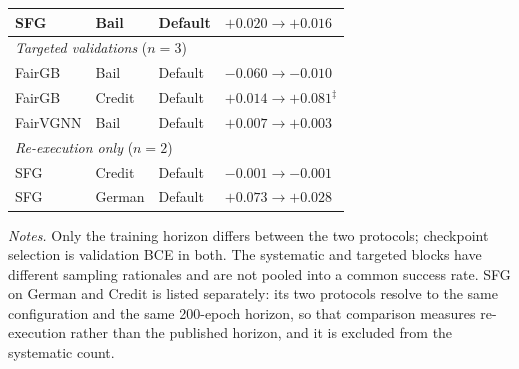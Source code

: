 \begin{table}[t]
\begin{tabular}{llll}
SFG & Bail & Default
& \(+0.020 \rightarrow +0.016\) \\

\midrule
\multicolumn{4}{l}{\textit{Targeted validations} (\(n=3\))} \\
\addlinespace[1pt]

FairGB & Bail & Default
& \(-0.060 \rightarrow -0.010\) \\
FairGB & Credit & Default
& \(+0.014 \rightarrow \mathbf{+0.081}^{\ddagger}\) \\
FairVGNN & Bail & Default
& \(+0.007 \rightarrow +0.003\) \\


\midrule
\multicolumn{4}{l}{\textit{Re-execution only} (\(n=2\))} \\
\addlinespace[1pt]

SFG & Credit & Default
& \(-0.001 \rightarrow -0.001\) \\
SFG & German & Default
& \(+0.073 \rightarrow +0.028\) \\

\bottomrule
\end{tabular}

\vspace{2pt}
\begin{minipage}{0.94\textwidth}
\footnotesize
\vspace{0.2cm}
\textit{Notes.}
Only the training horizon differs between the two protocols; checkpoint selection is validation BCE in both.
The systematic and targeted blocks have different sampling rationales and are not pooled into a common success rate.
SFG on German and Credit is listed separately: its two protocols resolve to the same configuration and the same 200-epoch horizon, so that comparison measures re-execution rather than the published horizon, and it is excluded from the systematic count.
\end{minipage}
\end{table}
